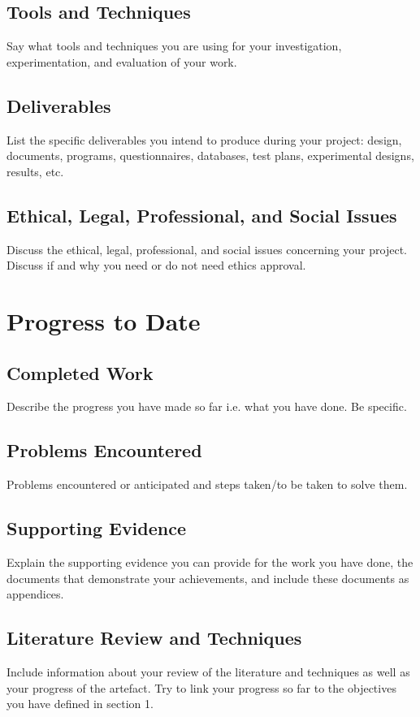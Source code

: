 \documentclass[a4paper,12pt]{article}
\begin{document}
	\subsection{Tools and Techniques}
	Say what tools and techniques you are using for your investigation, experimentation, and evaluation of your work.
	
	\subsection{Deliverables}
	List the specific deliverables you intend to produce during your project: design, documents, programs, questionnaires, databases, test plans, experimental designs, results, etc.
	
	\subsection{Ethical, Legal, Professional, and Social Issues}
	Discuss the ethical, legal, professional, and social issues concerning your project. Discuss if and why you need or do not need ethics approval.
	
	\section{Progress to Date}
	\subsection{Completed Work}
	Describe the progress you have made so far i.e. what you have done. Be specific.
	
	\subsection{Problems Encountered}
	Problems encountered or anticipated and steps taken/to be taken to solve them.
	
	\subsection{Supporting Evidence}
	Explain the supporting evidence you can provide for the work you have done, the documents that demonstrate your achievements, and include these documents as appendices.
	
	\subsection{Literature Review and Techniques}
	Include information about your review of the literature and techniques as well as your progress of the artefact. Try to link your progress so far to the objectives you have defined in section 1.
	
\end{document}
